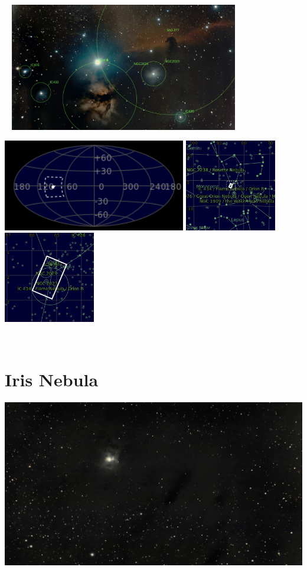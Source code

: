 \begin{center}
 \ \newpage
\includegraphics[width=0.75\textwidth]{../Imaging//Annotated/Horse_Head_Nebula_Annotated.jpg}

\includegraphics[height=4cm]{../Imaging//Annotated/Horse_Head_Nebula_Globe.jpg}
\includegraphics[height=4cm]{../Imaging//Annotated/Horse_Head_Nebula_Close.jpg}
\includegraphics[height=4cm]{../Imaging//Annotated/Horse_Head_Nebula_Closer.jpg}
\end{center}
\ \\\section{Iris Nebula}
\includegraphics[width=\textwidth]{../Imaging//Original/Iris_Nebula.jpg}
